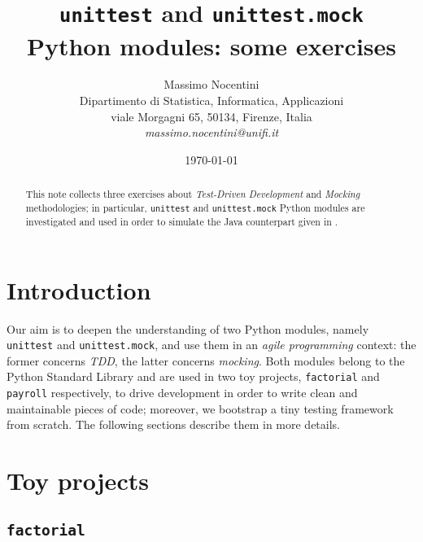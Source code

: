 \documentclass[12pt]{article}
\begin{document}
\title{\texttt{unittest} and \texttt{unittest.mock}\\ Python modules: some exercises}
\author{Massimo Nocentini\\
Dipartimento di Statistica, Informatica, Applicazioni \\ 
viale Morgagni 65, 50134, Firenze, Italia \\ 
{\sl  massimo.nocentini@unifi.it}}

\date{\today}

\maketitle

\begin{abstract}

This note collects three exercises about \textit{Test-Driven Development}
and \textit{Mocking} methodologies; in particular, \texttt{unittest} and
\texttt{unittest.mock} Python modules are investigated and used
in order to simulate the Java counterpart given in \cite{course}. 
 
\end{abstract}

\section{Introduction}

Our aim is to deepen the understanding of two Python modules, namely
\texttt{unittest} and \texttt{unittest.mock}, and use them in an \emph{agile
programming} context: the former concerns \textit{TDD}, the latter concerns
\textit{mocking}.  Both modules belong to the Python Standard Library
\cite{psl} and are used in two toy projects, \texttt{factorial} and
\texttt{payroll} respectively, to drive development in order to write clean
and maintainable pieces of code; moreover, we bootstrap a tiny testing framework
from scratch. The following sections describe them in more details.

\section{Toy projects}

\subsection{\texttt{factorial}}

\inputminted{python}{../factorial/factorial.py}
\inputminted{python}{../factorial/factorial_test.py}
\end{document}
